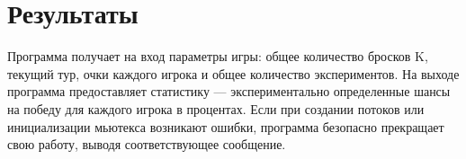 \section{Результаты}

Программа получает на вход параметры игры: общее количество бросков K, текущий тур, очки каждого игрока и общее количество экспериментов. На выходе программа предоставляет статистику — экспериментально определенные шансы на победу для каждого игрока в процентах. Если при создании потоков или инициализации мьютекса возникают ошибки, программа безопасно прекращает свою работу, выводя соответствующее сообщение.